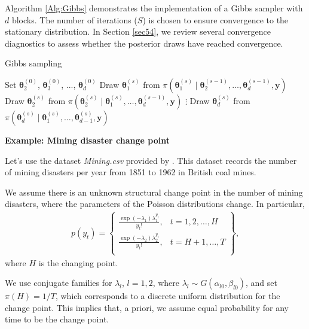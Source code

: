 Algorithm \ref{Alg:Gibbs} demonstrates the implementation of a Gibbs sampler with $d$ blocks. The number of iterations ($S$) is chosen to ensure convergence to the stationary distribution. In Section \ref{sec54}, we review several convergence diagnostics to assess whether the posterior draws have reached convergence.

\begin{algorithm}[h!]
	\caption{Gibbs sampling}\label{Alg:Gibbs}
	\begin{algorithmic}[1]  		 			
		\State Set $\bm{\theta}_2^{(0)}$, $\bm{\theta}_3^{(0)}$, ..., $\bm{\theta}_d^{(0)}$
		\State Draw $\bm{\theta}_1^{(s)}$ from $\pi(\bm{\theta}_1^{(s)}\mid \bm{\theta}_2^{(s-1)},\dots,\bm{\theta}_d^{(s-1)},\bm{y})$
		\State Draw $\bm{\theta}_2^{(s)}$ from $\pi(\bm{\theta}_2^{(s)}\mid \bm{\theta}_1^{(s)},\dots,\bm{\theta}_d^{(s-1)},\bm{y})$
		\State $\vdots$
		\State Draw $\bm{\theta}_d^{(s)}$ from $\pi(\bm{\theta}_d^{(s)}\mid \bm{\theta}_1^{(s)},\dots,\bm{\theta}_{d-1}^{(s)},\bm{y})$ 
		\EndFor 
		\end{algorithmic} 
\end{algorithm}

\textbf{Example: Mining disaster change point}

Let's use the dataset \textit{Mining.csv} provided by \cite{carlin1992hierarchical}. This dataset records the number of mining disasters per year from 1851 to 1962 in British coal mines.

We assume there is an unknown structural change point in the number of mining disasters, where the parameters of the Poisson distributions change. In particular,
\begin{align*}
	p(y_t)=\begin{Bmatrix}
		\frac{\exp(-\lambda_1)\lambda_1^{y_t}}{y_t!}, & t=1,2,\dots,H\\
		\frac{\exp(-\lambda_2)\lambda_2^{y_t}}{y_t!}, & t=H+1,\dots,T\\
	\end{Bmatrix},
\end{align*}  
where $H$ is the changing point.

We use conjugate families for $\lambda_l$, $l = 1, 2$, where $\lambda_l \sim G(\alpha_{l0}, \beta_{l0})$, and set $\pi(H) = 1 / T$, which corresponds to a discrete uniform distribution for the change point. This implies that, a priori, we assume equal probability for any time to be the change point.

